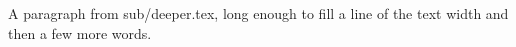 A paragraph from sub/deeper.tex, long enough to fill a line of the text width
and then a few more words.
